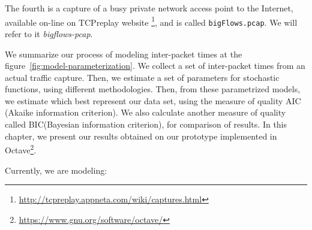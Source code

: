 The fourth is a capture of a busy private network access point to the Internet, available on-line on TCPreplay website \footnote{ \href{http://tcpreplay.appneta.com/wiki/captures.html}{http://tcpreplay.appneta.com/wiki/captures.html}}, and is called \texttt{bigFlows.pcap}. We will refer to it \textit{bigflows-pcap}.






We summarize our process of modeling inter-packet times at the figure~\ref{fig:model-parameterization}. We collect a set of inter-packet times from an actual traffic capture. Then, we estimate a set of parameters for stochastic functions, using different methodologies. Then, from these parametrized models, we estimate which best represent our data set, using the measure of quality AIC (Akaike information criterion). We also calculate another measure of quality called BIC(Bayesian information criterion), for comparison of results. In this chapter, we present our results obtained on our prototype implemented in Octave\footnote{ \href{https://www.gnu.org/software/octave/}{https://www.gnu.org/software/octave/}}. 

Currently, we are modeling:

